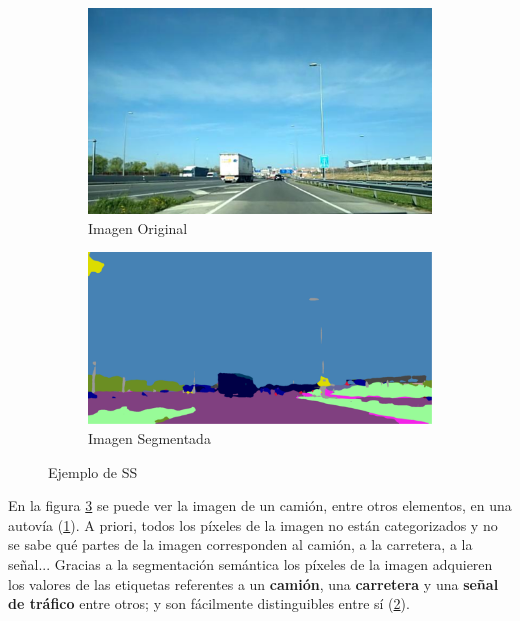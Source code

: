 \begin{figure}[H]
  \centering
  \begin{subfigure}[b]{0.45\linewidth}
    \includegraphics[width=\linewidth]{Figuras/Imagen_Original.eps}
    \caption{Imagen Original}
    \label{fig:ImgOrig}
  \end{subfigure}
    \begin{subfigure}[b]{0.5\linewidth}
    \includegraphics[width=\linewidth]{Figuras/Ejemplo_Imagen_Segmentada.eps}
    \caption{Imagen Segmentada}
    \label{fig:ImgSegm}
  \end{subfigure}
  \caption{Ejemplo de \ac{SS}}
  \label{fig:SS}
\end{figure}

En la figura \ref{fig:SS} se puede ver la imagen de un camión, entre otros elementos, en una autovía (\ref{fig:ImgOrig}). A priori, todos los píxeles de la imagen no están categorizados y no se sabe qué partes de la imagen corresponden al camión, a la carretera, a la señal... Gracias a la segmentación semántica los píxeles de la imagen adquieren los valores de las etiquetas referentes a un \textbf{camión}, una \textbf{carretera} y una \textbf{señal de tráfico} entre otros; y son fácilmente distinguibles entre sí (\ref{fig:ImgSegm}). 

